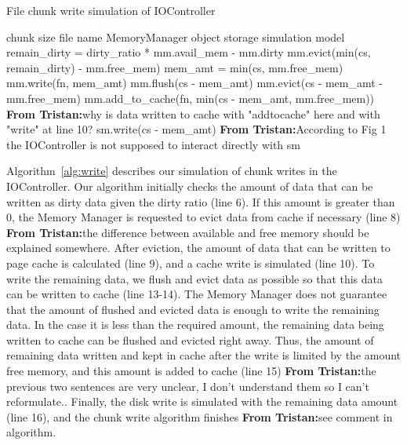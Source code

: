 \documentclass[conference]{IEEEtran}
\newcommand{\Desc}[2]{\State \makebox[2em][l]{#1}#2}
\newcommand{\tristan}[1]{\color{orange}\textbf{From Tristan:}#1\color{black}}
\begin{document}
    \begin{algorithm}\caption{File chunk write simulation of IOController}
    \label{alg:write}
        \small
        \begin{algorithmic}[1]
            \Input
                \Desc{cs}{chunk size}
                \Desc{fn}{file name}
                \Desc{mm}{MemoryManager object}
                \Desc{sm}{storage simulation model}
               \EndInput
            \State remain\_dirty = dirty\_ratio * mm.avail\_mem - mm.dirty
             
                \State mm.evict(min(cs, remain\_dirty) - mm.free\_mem)
                \State mem\_amt = min(cs, mm.free\_mem)
                \State mm.write(fn, mem\_amt) 
            \EndIf
              
                \State mm.flush(cs - mem\_amt)  
                \State mm.evict(cs - mem\_amt  - mm.free\_mem) 
                \State mm.add\_to\_cache(fn, min(cs - mem\_amt, mm.free\_mem)) \tristan{why is data written to cache with "addtocache" here and with "write" at line 10?}
                \State sm.write(cs - mem\_amt) \tristan{According to Fig 1 the IOController is not supposed to interact directly with sm}
            \EndIf
            
        \end{algorithmic}
    \end{algorithm}
    Algorithm~\ref{alg:write} describes our simulation of chunk writes in 
    the IOController. 
    Our algorithm initially checks the  amount of data that 
    can be written as dirty data given the dirty ratio (line 6).
    If this amount is greater than 0, the Memory Manager is requested to evict 
    data from cache if necessary (line 8) \tristan{the difference between available and free memory should be explained somewhere}.
    After eviction, the amount of data that can be written to 
    page cache is calculated (line 9), and a cache write is simulated (line 10).
    To write the remaining data, we flush and 
    evict data as possible so that this data can be 
    written to cache (line 13-14). 
    The Memory Manager does not guarantee that the amount of flushed 
    and evicted data is enough to write the remaining data. 
    In the case it is less than the required amount, the remaining data 
    being written to cache can be flushed and evicted right away. 
    Thus, the amount of remaining data written and kept in cache 
    after the write is limited by the amount free memory, and this amount 
    is added to cache (line 15) \tristan{the previous two sentences are very unclear, I don't understand them so I can't reformulate.}. 
    Finally, the disk write is simulated with the remaining data amount (line 16), 
    and the chunk write algorithm finishes \tristan{see comment in algorithm}.
            
\end{document}

